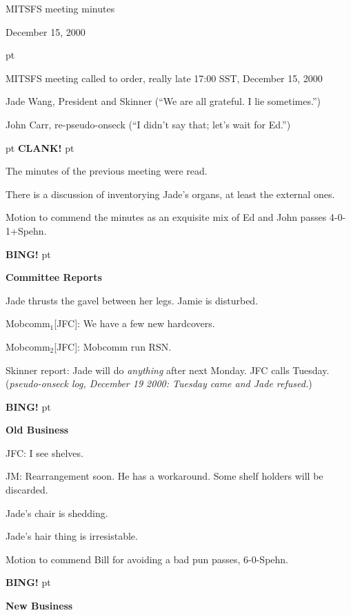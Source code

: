 \centerline{MITSFS meeting minutes}
\centerline{December 15, 2000}

 pt

MITSFS meeting called to order, really late 17:00 SST, December 15, 2000

Jade Wang, President and Skinner (``We are all grateful.  I lie sometimes.'')

John Carr, re-pseudo-onseck (``I didn't say that; let's wait for Ed.'')

 pt
{\bf CLANK!}
 pt


The minutes of the previous meeting were read.

There is a discussion of inventorying Jade's organs, at least the
external ones.

Motion to commend the minutes as an exquisite mix of Ed and
John passes \hbox{4-0-1+Spehn}.

\vskip 12pt

{\bf BING!}
 pt

\centerline{\bf Committee Reports}

\vskip 12pt

Jade thrusts the gavel between her legs.  Jamie is disturbed.

Mobcomm$_1$[JFC]: We have a few new hardcovers.

Mobcomm$_2$[JFC]: Mobcomm run RSN.

Skinner report: Jade will do {\it anything} after next Monday.
JFC calls Tuesday.  ({\it pseudo-onseck log, December 19 2000: Tuesday came
and Jade refused.})


\vskip 12pt

{\bf BING!}
 pt

\centerline{\bf Old Business}

\vskip 12pt

JFC: I see shelves.

JM: Rearrangement soon.  He has a workaround.  Some shelf holders
will be discarded.

Jade's chair is shedding.

Jade's hair thing is irresistable.

Motion to commend Bill for avoiding a bad pun passes, \hbox{6-0-Spehn}.

\vskip 12pt

{\bf BING!}
 pt

\centerline{\bf New Business}

\vskip 12pt

